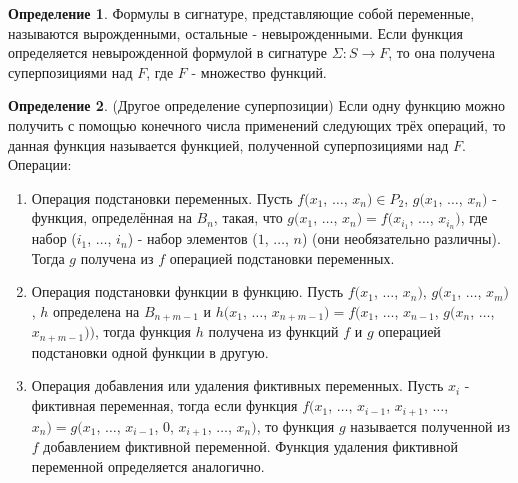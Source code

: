 \documentclass[a4paper, 12pt]{article}
\theoremstyle{definition}
\newtheorem*{definition}{Определение}
\theoremstyle{plain}
\theoremstyle{remark}
\begin{document}
  \begin{definition}
    Формулы в сигнатуре, представляющие собой переменные, называются вырожденными, остальные - невырожденными. Если функция определяется невырожденной формулой в сигнатуре $\Sigma:S \to F$, то она получена суперпозициями над $F$, где $F$ - множество функций.
  \end{definition}
  \begin{definition}
    (Другое определение суперпозиции) Если одну функцию можно получить с помощью конечного числа применений следующих трёх операций, то данная функция называется функцией, полученной суперпозициями над $F$.\\
    Операции:\\
    \begin{enumerate}
      \item Операция подстановки переменных. Пусть $f(x_1$, $\ldots$, $x_n)\in P_2$, $g(x_1$, $\ldots$, $x_n)$ - функция, определённая на $B_n$, такая, что $g(x_1$, $\ldots$, $x_n)=f(x_{i_1}$, $\ldots$, $x_{i_n})$, где набор ($i_1$, $\ldots$, $i_n$) - набор элементов ($1$, $\ldots$, $n$) (они необязательно различны). Тогда $g$ получена из $f$ операцией подстановки переменных.
      \item Операция подстановки функции в функцию. Пусть $f(x_1$, $\ldots$, $x_n)$, $g(x_1$, $\ldots$, $x_m)$, $h$ определена на $B_{n+m-1}$ и $h(x_1$, $\ldots$, $x_{n+m-1})=f(x_1$, $\ldots$, $x_{n-1}$, $g(x_n$, $\ldots$, $x_{n+m-1}))$, тогда функция $h$ получена из функций $f$ и $g$ операцией подстановки одной функции в другую.
      \item Операция добавления или удаления фиктивных переменных. Пусть $x_i$ - фиктивная переменная, тогда если функция $f(x_1$, $\ldots$, $x_{i-1}$, $x_{i+1}$, $\ldots$, $x_n)=g(x_1$, $\ldots$, $x_{i-1}$, $0$, $x_{i+1}$, $\ldots$, $x_n)$, то функция $g$ называется полученной из $f$ добавлением фиктивной переменной. Функция удаления фиктивной переменной определяется аналогично.
    \end{enumerate}
  \end{definition}
\end{document}
